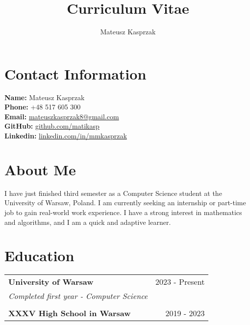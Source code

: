 \documentclass[a4paper,10pt]{article}
\begin{document}
\title{\vspace{-3cm}Curriculum Vitae}
\author{Mateusz Kasprzak}
\date{}

\maketitle

\section*{Contact Information}
\begin{tabbing}
\textbf{Name:} \hspace{2.1cm} Mateusz Kasprzak \\
\textbf{Phone:} \hspace{2.0cm} +48 517 605 300 \\
\textbf{Email:} \hspace{2.1cm} \href{mailto:mateuszkasprzak8@gmail.com}{mateuszkasprzak8@gmail.com} \\
\textbf{GitHub:} \hspace{1.8cm} \href{https://github.com/matikasp}{github.com/matikasp} \\
\textbf{Linkedin:} \hspace{1.6cm} \href{https://linkedin.com/in/mmkasprzak}{linkedin.com/in/mmkasprzak}
\end{tabbing}

\section*{About Me}
I have just finished third semester as a Computer Science student at the University of Warsaw, Poland. I am currently seeking an internship or part-time job to gain real-world work experience. I have a strong interest in mathematics and algorithms, and I am a quick and adaptive learner.

\section*{Education}
\begin{tabularx}{\textwidth}{Xr}
\textbf{University of Warsaw} & 2023 - Present \\
\emph{Completed first year - Computer Science} & \\
\\
\textbf{XXXV High School in Warsaw} & 2019 - 2023 \\
\end{tabularx}
\end{document}
